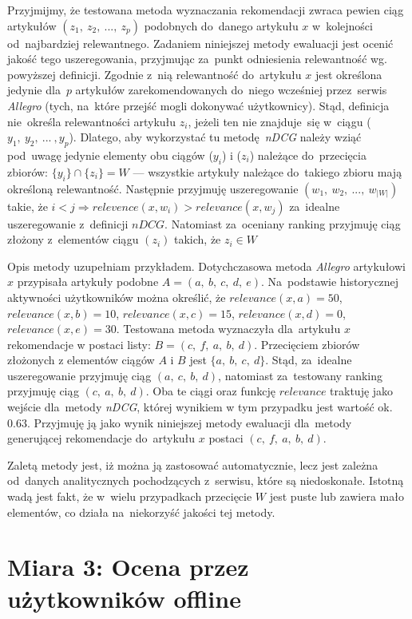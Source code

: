 \documentclass[pl]{minipw} %
\begin{document}
Przyjmijmy, że testowana metoda wyznaczania rekomendacji zwraca pewien ciąg artykułów $(z_1,\ z_2,\ ...,\ z_p)$ podobnych do~danego artykułu $x$ w~kolejności od~najbardziej relewantnego. Zadaniem niniejszej metody ewaluacji jest ocenić jakość tego uszeregowania, przyjmując za~punkt odniesienia relewantność wg. powyższej definicji. Zgodnie z~nią relewantność do~artykułu $x$ jest określona jedynie dla~$p$ artykułów zarekomendowanych do~niego wcześniej przez~serwis \textit{Allegro} (tych, na~które przejść mogli dokonywać użytkownicy). Stąd, definicja nie~określa relewantności artykułu $z_i$, jeżeli ten nie znajduje~się w~ciągu ($y_1,\ y_2,\ ...\ ,y_p$). Dlatego, aby wykorzystać tu metodę \textit{nDCG} należy wziąć pod~uwagę jedynie elementy obu ciągów ($y_i$) i ($z_i$) należące do~przecięcia zbiorów: $\{y_i\} \cap \{z_i\} = W$ --- wszystkie artykuły należące do~takiego zbioru mają określoną relewantność. Następnie przyjmuję uszeregowanie $(w_1,\ w_2,\ ...,\ w_{|W|})$ takie, że $i<j \Rightarrow relevence(x,w_i) > relevance(x,w_j)$ za~idealne uszeregowanie z~definicji $nDCG$. Natomiast za~oceniany ranking przyjmuję ciąg złożony z~elementów ciągu $(z_i)$ takich, że $z_i \in W$ 


Opis metody uzupełniam przykładem. Dotychczasowa metoda \textit{Allegro} artykułowi $x$ przypisała artykuły podobne $A = (a,\ b,\ c,\ d,\ e)$. Na~podstawie historycznej aktywności użytkowników można określić, że $relevance(x, a)=50$, $relevance(x, b)=10$, $relevance(x, c)=15$, $relevance(x, d)=0$, $relevance(x, e)=30$. Testowana metoda wyznaczyła dla~artykułu $x$ rekomendacje w postaci listy: $B=(c,\ f,\ a,\ b,\ d)$. Przecięciem zbiorów złożonych z elementów ciągów $A$ i $B$ jest $\{a,\ b,\ c,\ d\}$. Stąd, za~idealne uszeregowanie przyjmuję ciąg $(a,\ c,\ b,\ d)$, natomiast za~testowany ranking przyjmuję ciąg $(c,\ a,\ b,\ d)$. Oba te ciągi oraz funkcję $relevance$ traktuję jako wejście dla~metody \textit{nDCG}, której wynikiem w tym przypadku jest wartość ok. $0.63$. Przyjmuję ją jako wynik niniejszej metody ewaluacji dla~metody generującej rekomendacje do~artykułu $x$ postaci $(c,\ f,\ a,\ b,\ d)$.
 
 
Zaletą metody jest, iż można ją zastosować automatycznie, lecz jest zależna od~danych analitycznych pochodzących z~serwisu, które są niedoskonałe. Istotną wadą jest fakt, że w~wielu przypadkach przecięcie $W$ jest puste lub zawiera mało elementów, co działa na~niekorzyść jakości tej metody.

\section{Miara 3: Ocena przez użytkowników offline}
\end{document}
